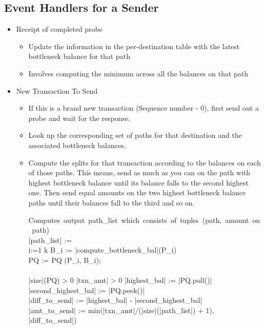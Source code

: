 \documentclass[a4paper]{article}
\begin{document}
\subsection{Event Handlers for a Sender}
\begin{itemize}
    \item Receipt of completed probe
        \begin{itemize}
            \item Update the information in the per-destination table with the latest bottleneck balance for that path
            \item Involves computing the minimum across all the balances on that path
        \end{itemize}

    \item New Transaction To Send
        \begin{itemize}
            \item If this is a brand new transaction (Sequence number - $0$), first send out a probe and wait for the response.
            \item Look up the corresponding set of paths for that destination and the associated bottleneck balances. 
            \item Compute the splits for that transaction according to the balances on each of those paths. This means, send as much as you can on the path with highest bottleneck balance 
                until its balance falls to the second highest one. Then send equal amounts on the two highest bottleneck balance paths until their balances fall to the third and so on. 
		
		\begin{program}
                \mbox{Computes output path\_list which consists of tuples (path, amount on path)}
		\BEGIN \\ %
                  |path_list| := \emptyset
                  ~\\
		  \FOR i:=1 \TO k \DO
		     B_i := |compute_bottleneck_bal|(P_i)\\ PQ := PQ \cup (P_i, B_i); %
		\END \\
                ~\\

                \DO \IF |size|(PQ) > 0 \AND |txn_amt| > 0	    
		  |highest_bal| := |PQ.poll()| %
		  \\
		  |second_highest_bal| := |PQ.peek()|\\
		  |diff_to_send| := |highest_bal| - |second_highest_bal|\\%
                  |amt_to_send| := min(|txn_amt|/(|size|(|path_list|) + 1), |diff_to_send|)
		 

\end{program}
\end{itemize}
\end{itemize}
\end{document}
